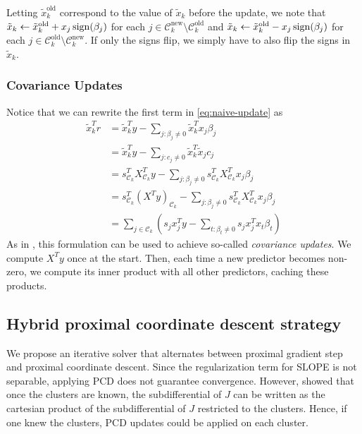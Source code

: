 Letting \(\tilde x_k^\text{old}\) correspond to the value of \(\tilde x_k\) before the update, we note that \(\tilde x_k \gets \tilde x_k^\text{old} + x_j \operatorname{sign}(\beta_j)\) for each \(j \in \mathcal{C}_k^\text{new} \setminus \mathcal{C}_k^\text{old}\) and \(\tilde x_k \gets \tilde x_k^\text{old} - x_j \operatorname{sign}(\beta_j)\) for each \(j \in \mathcal{C}_k^\text{old} \setminus \mathcal{C}_k^\text{new}\).
If only the signs flip, we simply have to also flip the signs in \(\tilde x_k\).

\subsubsection{Covariance Updates}

Notice that we can rewrite the first term in \eqref{eq:naive-update} as
\begin{equation}
  \begin{aligned}
    \tilde x_k^T r & = \tilde x_k^T y - \sum_{j : \beta_j \neq 0} \tilde x_k^T x_j \beta_j                                                                    \\
                   & = \tilde x_k^T y - \sum_{j : c_j \neq 0} \tilde x_k^T \tilde x_j c_j                                                                     \\
                   & = s_{\mathcal{C}_k}^T X_{\mathcal{C}_k}^T y - \sum_{j : \beta_j \neq 0} s_{\mathcal{C}_k}^T X_{\mathcal{C}_k}^T x_j \beta_j              \\
                   & = s_{\mathcal{C}_k}^T \left(X^T y\right)_{\mathcal{C}_k} - \sum_{j : \beta_j \neq 0} s_{\mathcal{C}_k}^T X_{\mathcal{C}_k}^T x_j \beta_j \\
                   & = \sum_{j \in \mathcal{C}_k}\left( s_j x_j^Ty - \sum_{t : \beta_t \neq 0} s_j x_j^T x_t \beta_t \right)
  \end{aligned}
\end{equation}
As in \textcite{friedman2010}, this formulation can be used to achieve so-called \emph{covariance updates}.
We compute \(X^T y\) once at the start.
Then, each time a new predictor becomes non-zero, we compute its inner product with all other predictors, caching these products.

\subsection{Hybrid proximal coordinate descent strategy}

We propose an iterative solver that alternates between proximal gradient step and proximal coordinate descent.
Since the regularization term for SLOPE is not separable, applying PCD does not guarantee convergence.
However, \cite{dupuis2021} showed that once the clusters are known, the subdifferential of $J$ can be written as the cartesian product of the subdifferential of $J$ restricted to the clusters.
Hence, if one knew the clusters, PCD updates could be applied on each cluster.

